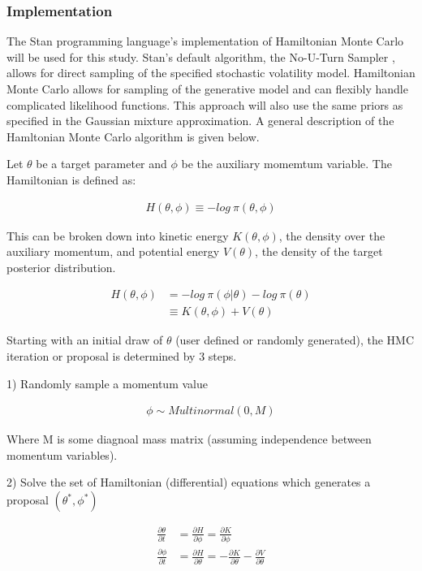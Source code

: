 \documentclass[12pt, a4paper]{article}
\begin{document}
        \subsubsection{Implementation}
        The Stan programming language's implementation of Hamiltonian Monte Carlo will be used for this study. Stan's default algorithm, the No-U-Turn Sampler \citep{hoffman2014no}, allows for direct sampling of the specified stochastic volatility model. Hamiltonian Monte Carlo allows for sampling of the generative model and can flexibly handle complicated likelihood functions. This approach will also use the same priors as specified in the Gaussian mixture approximation. A general description of the Hamltonian Monte Carlo algorithm is given below.

        Let $\theta$ be a target parameter and $\phi$ be the auxiliary momemtum variable. The Hamiltonian is defined as:

        $$
        \begin{aligned}
        H(\theta, \phi) \equiv - log \: \pi(\theta, \phi)
        \end{aligned}
        $$

        This can be broken down into kinetic energy $K(\theta, \phi)$, the density over the auxiliary momentum, and potential energy $V(\theta)$, the density of the target posterior distribution.

        $$
        \begin{aligned}
        H(\theta, \phi) &= - log \: \pi(\phi | \theta) - log \: \pi(\theta) \\ 
        &\equiv  K(\theta, \phi) + V(\theta)
        \end{aligned}
        $$

         Starting with an initial draw of $\theta$ (user defined or randomly generated), the HMC iteration or proposal is determined by 3 steps.

        1) Randomly sample a momentum value

        $$
        \begin{aligned}
        \phi\sim Multinormal(0, M)
        \end{aligned}
        $$

        Where M is some diagnoal mass matrix (assuming independence between momentum variables).

        2) Solve the set of Hamiltonian (differential) equations which generates a proposal $(\theta^{\ast}, \phi^{\ast})$

        $$
        \begin{aligned}
        \frac{\partial \theta}{\partial t} &= \frac{\partial H}{\partial \phi} = \frac{\partial K}{\partial \phi} \\
        \frac{\partial \phi}{\partial t} &= \frac{\partial H}{\partial \theta} = - \frac{\partial K}{\partial \theta} - \frac{\partial V}        {\partial \theta}
        \end{aligned}
        $$
\end{document}
